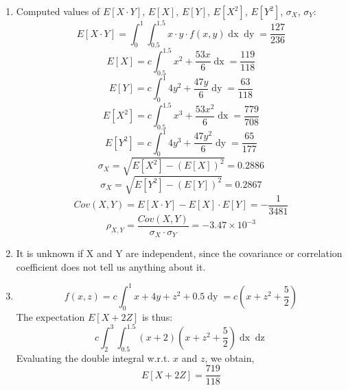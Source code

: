 \documentclass[a4paper]{article}
\begin{document}
\begin{enumerate}
\item Computed values of $E[X\cdot Y]$, $E[X]$, $E[Y]$, $E[X^2]$, $E[Y^2]$, $\sigma_X$, $\sigma_Y$:
\begin{equation}
E[X\cdot Y] = \int_0^1 \int_{0.5}^{1.5} x\cdot y\cdot f(x,y) \mathop{dx} \mathop{dy} = \frac{127}{236}
\end{equation}
\begin{equation}
E[X] = c\int_{0.5}^{1.5}x^2+\frac{53x}{6} \mathop{dx} = \frac{119}{118}
\end{equation}
\begin{equation}
E[Y] = c\int_{0}^{1}4y^2+\frac{47y}{6} \mathop{dy} = \frac{63}{118}
\end{equation}
\begin{equation}
E[X^2] = c\int_{0.5}^{1.5}x^3+\frac{53x^2}{6} \mathop{dx} = \frac{779}{708}
\end{equation}
\begin{equation}
E[Y^2] = c\int_{0}^{1}4y^3+\frac{47y^2}{6} \mathop{dy} = \frac{65}{177}
\end{equation}
\begin{equation}
\sigma_X = \sqrt{E[X^2]-(E[X])^2} = 0.2886
\end{equation}
\begin{equation}
\sigma_X = \sqrt{E[Y^2]-(E[Y])^2} = 0.2867
\end{equation}
\begin{equation}
Cov(X,Y) = E[X\cdot Y] - E[X]\cdot E[Y] = -\frac{1}{3481}
\end{equation}
\begin{equation}
\rho_{X,Y} = \frac{Cov(X,Y)}{\sigma_X \cdot \sigma_Y} = -3.47 \times 10^{-3}
\end{equation}
\item It is unknown if X and Y are independent, since the covariance or correlation coefficient does not tell us anything about it.
\item
\begin{equation}
f(x,z) = c\int_0^1 x+4y+z^2+0.5 \mathop{dy} = c\left(x+z^2+\frac{5}{2}\right)
\end{equation}
The expectation $E[X+2Z]$ is thus:
\begin{equation}
c\int_2^3\int_{0.5}^{1.5}\left(x+2\right)\left(x+z^2+\frac{5}{2}\right)\mathop{dx} \mathop{dz}
\end{equation}
Evaluating the double integral w.r.t. $x$ and $z$, we obtain,
\begin{equation}
E[X+2Z]=\frac{719}{118}
\end{equation}
\end{enumerate}
\end{document}
